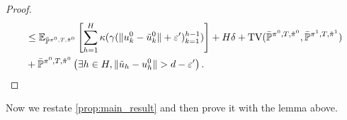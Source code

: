 \documentclass{article}
\begin{document}
\begin{proof}
\begin{align*}
        &\leq \mathbb E_{\bar {\mathbb P}^{\pi^0, T, \tilde \pi^0}}\left[\sum_{h=1}^H\kappa(\gamma(\|u_k^0-\tilde u_k^0\| + \varepsilon^\prime)_{k=1}^{h-1})\right]+H\delta+\textnormal{TV}(\bar{\mathbb P}^{\pi^0,T,\tilde \pi^0},\bar{\mathbb P}^{\pi^1, T, \tilde \pi^1})\\&+\bar{\mathbb P}^{\pi^0, T, \tilde \pi^0}\left(\exists h\in H, \|\tilde u_h-u_h^0\|>d-\varepsilon^\prime\right). \qedhere
    \end{align*}



\end{proof}











Now we restate \cref{prop:main_result} and then prove it with the lemma above.
\MainProp*
\end{document}
